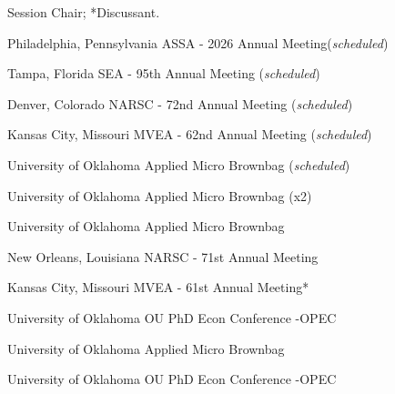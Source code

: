 \textdagger Session Chair; *Discussant.


{%
	Philadelphia, Pennsylvania}
{%
	ASSA - 2026 Annual Meeting\ec (\textit{scheduled})}
{}


{%
	Tampa, Florida}
{%
	SEA - 95th Annual Meeting (\textit{scheduled})}
{}


{%
	Denver, Colorado}
{%
	NARSC - 72nd Annual Meeting (\textit{scheduled})}
{}

{%
	Kansas City, Missouri}
{%
	MVEA - 62nd Annual Meeting (\textit{scheduled})}
{}

{%
	University of Oklahoma}
{%
	Applied Micro Brownbag (\textit{scheduled})}
{}

{%
	University of Oklahoma}
{%
	Applied Micro Brownbag (x2)}
{}

{%
	University of Oklahoma}
{%
	Applied Micro Brownbag}
{}

{%
	New Orleans, Louisiana}
{%
	NARSC - 71st Annual Meeting\ec}
{}

{%
	Kansas City, Missouri}
{%
	MVEA - 61st Annual Meeting*}
{}


{%
	University of Oklahoma}
{%
	OU PhD Econ Conference -OPEC}
{}

{%
	University of Oklahoma}
{%
	Applied Micro Brownbag}
{}

{%
	University of Oklahoma}
{%
	OU PhD Econ Conference -OPEC}
{}
